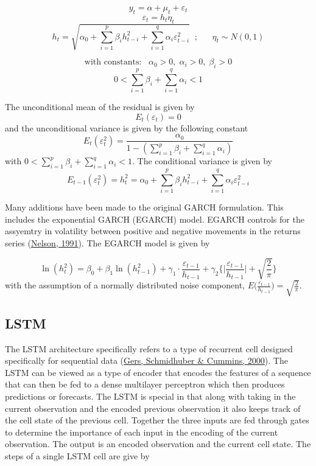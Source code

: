 \documentclass[11pt,preprint, authoryear]{elsarticle}
\numberwithin{equation}{section}
\numberwithin{figure}{section}
\numberwithin{table}{section}
\begin{document}
\[
y_t = \alpha + \mu_t + \varepsilon_t 
\] \[
\varepsilon_t = h_t\eta_t
\] \[
h_t = \sqrt{\alpha_0 + \sum_{i=1}^p \beta_i h_{t-i}^2 + \sum_{i=1}^q \alpha_i \varepsilon_{t-i}^2}\;\; ; \;\;\;\;\;\ \eta_t \sim N(0,1)
\]

\[
\text{with constants:} \;\;\; \alpha_0>0, \; \alpha_i >0, \; \beta_i>0
\] \[
0 < \sum_{i=1}^p \beta_i+ \sum_{i=1}^q \alpha_i < 1
\]

The unconditional mean of the residual is given by \[
E_t(\varepsilon_t) = 0
\] and the unconditional variance is given by the following constant \[
E_t(\varepsilon_t^2) = \frac{\alpha_0}{1-(\sum_{i=1}^p \beta_i+ \sum_{i=1}^q \alpha_i)}
\] with \(0 < \sum_{i=1}^p \beta_i+ \sum_{i=1}^q \alpha_i < 1\). The
conditional variance is given by \[
E_{t-1}(\varepsilon_t^2) = h_t^2 = \alpha_0 + \sum_{i=1}^p \beta_i h_{t-i}^2 + \sum_{i=1}^q \alpha_i \varepsilon_{t-i}^2
\]

\par

Many additions have been made to the original GARCH formulation. This
includes the exponential GARCH (EGARCH) model. EGARCH controls for the
assyemtry in volatility between positive and negative movements in the
returns series (\protect\hyperlink{ref-nelson}{Nelson, 1991}). The
EGARCH model is given by

\[
\ln(h_t^2) = \beta_0 + \beta_1\ln(h_{t-1}^2) + \gamma_1 \cdot \frac{\varepsilon_{t-1}}{h_{t-1}} + \gamma_2 \Bigg\{ \Bigg| \frac{\varepsilon_{t-1}}{h_{t-1}} \Bigg| +  \sqrt{\frac{2}{\pi}}\Bigg\}
\] with the assumption of a normally distributed noise component,
\(E\Big(\frac{\varepsilon_{t-1}}{h_{t-1}}\Big) = \sqrt{\frac{2}{\pi}}\).

\hypertarget{lstm}{%
\subsection{LSTM}\label{lstm}}

The LSTM architecture specifically refers to a type of recurrent cell
designed specifically for sequential data
(\protect\hyperlink{ref-lstm}{Gers, Schmidhuber \& Cummins, 2000}). The
LSTM can be viewed as a type of encoder that encodes the features of a
sequence that can then be fed to a dense multilayer perceptron which
then produces predictions or forecasts. The LSTM is special in that
along with taking in the current observation and the encoded previous
observation it also keeps track of the cell state of the previous cell.
Together the three inputs are fed through gates to determine the
importance of each input in the encoding of the current observation. The
output is an encoded observation and the current cell state. The steps
of a single LSTM cell are give by
\end{document}
